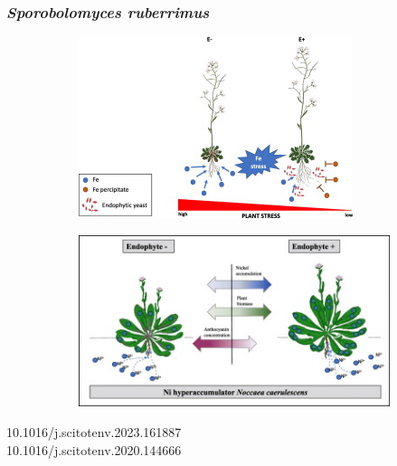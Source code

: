 \documentclass{beamer}
\begin{document}
\begin{frame}
    \frametitle{\textit{Sporobolomyces ruberrimus}}
    \begin{figure}
    \begin{subfigure}{.5\textwidth}
    \includegraphics[scale=0.7]{romek.jpg}
    \end{subfigure}%
    \begin{subfigure}{.5\textwidth}
    \begin{flushleft}
    \includegraphics[scale = 0.7]{piotr.jpg}
    \end{flushleft}
    \end{subfigure}
\end{figure}

\vspace{1cm}
\scriptsize{10.1016/j.scitotenv.2023.161887\\
10.1016/j.scitotenv.2020.144666}
\end{frame}
\end{document}
